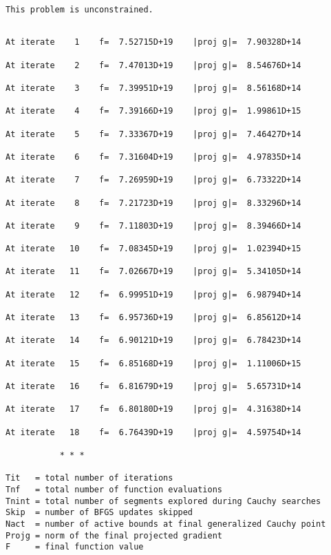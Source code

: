 \documentclass[11pt]{article}
\begin{document}
    \begin{Verbatim}[commandchars=\\\{\}]
 This problem is unconstrained.
    \end{Verbatim}

    \begin{Verbatim}[commandchars=\\\{\}]

At iterate    1    f=  7.52715D+19    |proj g|=  7.90328D+14

At iterate    2    f=  7.47013D+19    |proj g|=  8.54676D+14

At iterate    3    f=  7.39951D+19    |proj g|=  8.56168D+14

At iterate    4    f=  7.39166D+19    |proj g|=  1.99861D+15

At iterate    5    f=  7.33367D+19    |proj g|=  7.46427D+14

At iterate    6    f=  7.31604D+19    |proj g|=  4.97835D+14

At iterate    7    f=  7.26959D+19    |proj g|=  6.73322D+14

At iterate    8    f=  7.21723D+19    |proj g|=  8.33296D+14

At iterate    9    f=  7.11803D+19    |proj g|=  8.39466D+14

At iterate   10    f=  7.08345D+19    |proj g|=  1.02394D+15

At iterate   11    f=  7.02667D+19    |proj g|=  5.34105D+14

At iterate   12    f=  6.99951D+19    |proj g|=  6.98794D+14

At iterate   13    f=  6.95736D+19    |proj g|=  6.85612D+14

At iterate   14    f=  6.90121D+19    |proj g|=  6.78423D+14

At iterate   15    f=  6.85168D+19    |proj g|=  1.11006D+15

At iterate   16    f=  6.81679D+19    |proj g|=  5.65731D+14

At iterate   17    f=  6.80180D+19    |proj g|=  4.31638D+14

At iterate   18    f=  6.76439D+19    |proj g|=  4.59754D+14

           * * *

Tit   = total number of iterations
Tnf   = total number of function evaluations
Tnint = total number of segments explored during Cauchy searches
Skip  = number of BFGS updates skipped
Nact  = number of active bounds at final generalized Cauchy point
Projg = norm of the final projected gradient
F     = final function value


\end{Verbatim}
\end{document}
